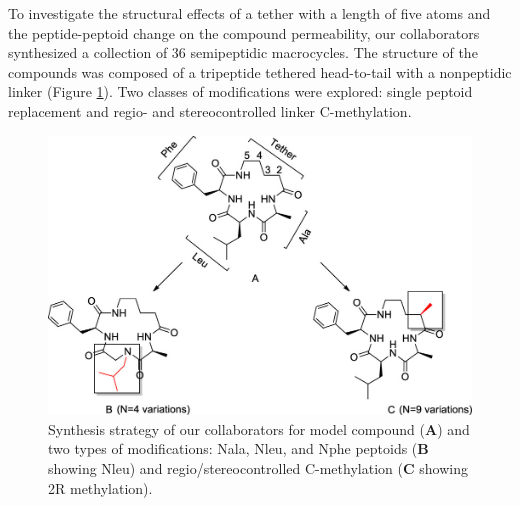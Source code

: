To investigate the structural effects of a tether with a length of five atoms and the peptide-peptoid change on the compound permeability, our collaborators synthesized a collection of 36 semipeptidic macrocycles. \cite{Comeau2021, Roux2020}
The structure of the compounds was composed of a tripeptide tethered head-to-tail with a nonpeptidic linker (Figure \ref{fig:MolDes}). 
Two classes of modifications were explored: single peptoid replacement and regio- and stereocontrolled linker C-methylation. 
%
\begin{figure}[h!]
    \centering
    \includegraphics[width=\textwidth]{7_chapter_5/fig/intro/MoleculeDesign.jpeg}
    \caption{Synthesis strategy of our collaborators for model compound (\textbf{A}) and two types of modifications: Nala, Nleu, and Nphe peptoids (\textbf{B} showing Nleu) and regio/stereocontrolled C-methylation (\textbf{C} showing 2R methylation).}
    \label{fig:MolDes}
\end{figure}

